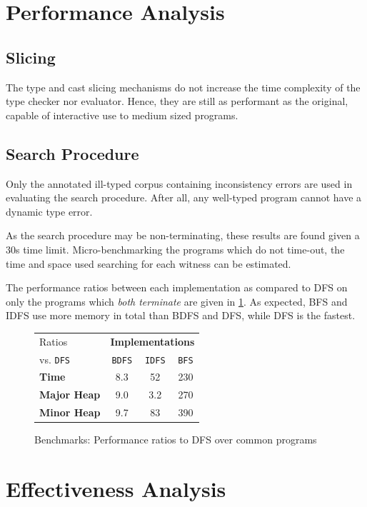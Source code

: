 \section{Performance Analysis}\label{sec:PerformanceAnalysis}
\subsection{Slicing}
The type and cast slicing mechanisms do not increase the time complexity of the type checker nor evaluator. Hence, they are still as performant as the original, capable of interactive use to medium sized programs.

\subsection{Search Procedure}
Only the annotated ill-typed corpus containing inconsistency errors are used in evaluating the search procedure. After all, any well-typed program cannot have a dynamic type error.

As the search procedure may be non-terminating, these results are found given a 30s time limit. Micro-benchmarking the programs which do not time-out, the time and space used searching for each witness can be estimated. 

The performance ratios between each implementation as compared to DFS on only the programs which \textit{both terminate} are given in \cref{fig:SearchPerformanceRatios}. As expected, BFS and IDFS use more memory in total than BDFS and DFS, while DFS is the fastest. 
\begin{figure}
  \centering
  \begin{tabular}{l|ccc}
  Ratios & \multicolumn{3}{c}{\textbf{Implementations}}\\
    vs. \texttt{DFS}& \texttt{BDFS} & \texttt{IDFS} & \texttt{BFS} \\
   \hline
   \textbf{Time} &  8.3 & 52 & 230\\
   \textbf{Major Heap} & 9.0 & 3.2 & 270\\
   \textbf{Minor Heap} & 9.7 & 83 & 390
  \end{tabular}
  
\caption{Benchmarks: Performance ratios to DFS over common programs}
\label{fig:SearchPerformanceRatios}
\end{figure}


\section{Effectiveness Analysis}\label{sec:EffectivenessAnalysis}


